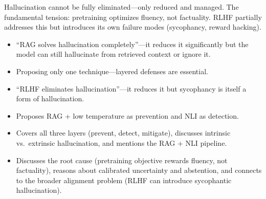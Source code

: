 \begin{interviewq}
Hallucination cannot be fully eliminated---only reduced and managed. The fundamental tension: pretraining optimizes fluency, not factuality. RLHF partially addresses this but introduces its own failure modes (sycophancy, reward hacking).

\redflags
\begin{itemize}
    \item ``RAG solves hallucination completely''---it reduces it significantly but the model can still hallucinate from retrieved context or ignore it.
    \item Proposing only one technique---layered defenses are essential.
    \item ``RLHF eliminates hallucination''---it reduces it but sycophancy is itself a form of hallucination.
\end{itemize}


\goodgreat
\begin{itemize}
    \item {} Proposes RAG + low temperature as prevention and NLI as detection.
    \item {} Covers all three layers (prevent, detect, mitigate), discusses intrinsic vs.\ extrinsic hallucination, and mentions the RAG + NLI pipeline.
    \item {} Discusses the root cause (pretraining objective rewards fluency, not factuality), reasons about calibrated uncertainty and abstention, and connects to the broader alignment problem (RLHF can introduce sycophantic hallucination).
\end{itemize}

\end{interviewq}


